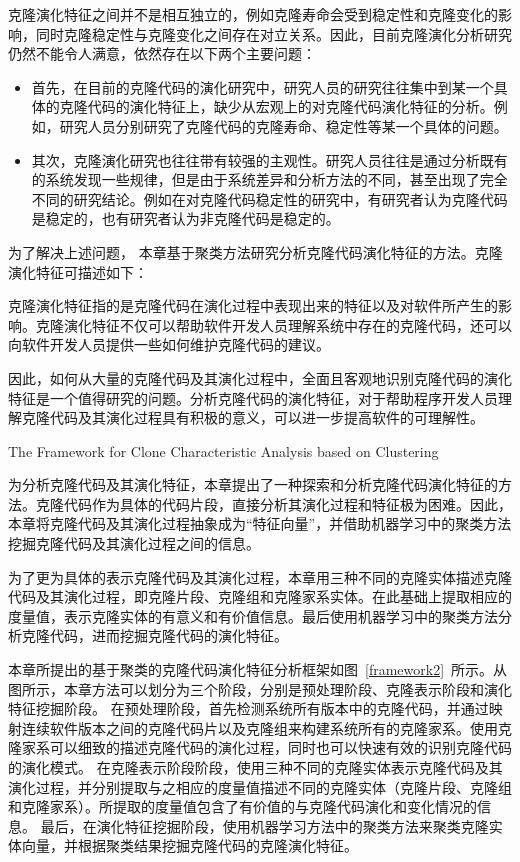 克隆演化特征之间并不是相互独立的，例如克隆寿命会受到稳定性和克隆变化的影响，同时克隆稳定性与克隆变化之间存在对立关系。因此，目前克隆演化分析研究仍然不能令人满意，依然存在以下两个主要问题：
\begin{itemize}
\item
首先，在目前的克隆代码的演化研究中，研究人员的研究往往集中到某一个具体的克隆代码的演化特征上，缺少从宏观上的对克隆代码演化特征的分析。例如，研究人员分别研究了克隆代码的克隆寿命、稳定性等某一个具体的问题。
\item
其次，克隆演化研究也往往带有较强的主观性。研究人员往往是通过分析既有的系统发现一些规律，但是由于系统差异和分析方法的不同，甚至出现了完全不同的研究结论。例如在对克隆代码稳定性的研究中，有研究者认为克隆代码是稳定的，也有研究者认为非克隆代码是稳定的。
\end{itemize}

为了解决上述问题， 本章基于聚类方法研究分析克隆代码演化特征的方法。克隆演化特征可描述如下：\\

\begin{definition}[克隆演化特征]
\label{defn-characteristics}
克隆演化特征指的是克隆代码在演化过程中表现出来的特征以及对软件所产生的影响。克隆演化特征不仅可以帮助软件开发人员理解系统中存在的克隆代码，还可以向软件开发人员提供一些如何维护克隆代码的建议。
\end {definition}

因此，如何从大量的克隆代码及其演化过程中，全面且客观地识别克隆代码的演化特征是一个值得研究的问题。分析克隆代码的演化特征，对于帮助程序开发人员理解克隆代码及其演化过程具有积极的意义，可以进一步提高软件的可理解性。

{The Framework for Clone Characteristic Analysis based on Clustering}

为分析克隆代码及其演化特征，本章提出了一种探索和分析克隆代码演化特征的方法。克隆代码作为具体的代码片段，直接分析其演化过程和特征极为困难。因此，本章将克隆代码及其演化过程抽象成为“特征向量”，并借助机器学习中的聚类方法挖掘克隆代码及其演化过程之间的信息。

为了更为具体的表示克隆代码及其演化过程，本章用三种不同的克隆实体描述克隆代码及其演化过程，即克隆片段、克隆组和克隆家系实体。在此基础上提取相应的度量值，表示克隆实体的有意义和有价值信息。最后使用机器学习中的聚类方法分析克隆代码，进而挖掘克隆代码的演化特征。

本章所提出的基于聚类的克隆代码演化特征分析框架如图~\ref{framework2}~所示。从图所示，本章方法可以划分为三个阶段，分别是预处理阶段、克隆表示阶段和演化特征挖掘阶段。 在预处理阶段，首先检测系统所有版本中的克隆代码，并通过映射连续软件版本之间的克隆代码片以及克隆组来构建系统所有的克隆家系。使用克隆家系可以细致的描述克隆代码的演化过程，同时也可以快速有效的识别克隆代码的演化模式。 在克隆表示阶段阶段，使用三种不同的克隆实体表示克隆代码及其演化过程，并分别提取与之相应的度量值描述不同的克隆实体（克隆片段、克隆组和克隆家系）。所提取的度量值包含了有价值的与克隆代码演化和变化情况的信息。 最后，在演化特征挖掘阶段，使用机器学习方法中的聚类方法来聚类克隆实体向量，并根据聚类结果挖掘克隆代码的克隆演化特征。


